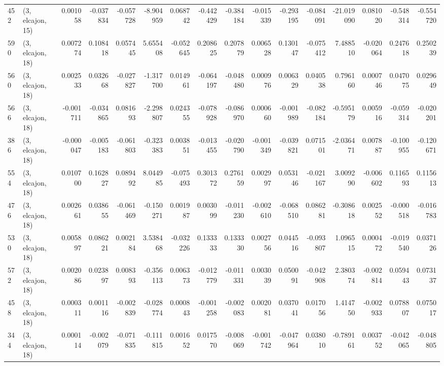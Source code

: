 \begin{tabular}{llrrrrrrrrrrrrrr}
452 &  (3, elcajon, 15) &   0.001058 & -0.037834 & -0.057728 &   -8.904959 &  0.068742 &  -0.442429 &  -0.384184 & -0.015339 & -0.293195 & -0.084091 &  -21.019090 &  0.081020 &  -0.548314 &  -0.554720 \\
590 &  (3, elcajon, 18) &   0.007274 &  0.108418 &  0.057445 &    5.655408 & -0.052645 &   0.208625 &   0.207879 &  0.006528 &  0.130147 & -0.075412 &    7.488510 & -0.020064 &   0.247618 &   0.250239 \\
560 &  (3, elcajon, 18) &   0.002533 &  0.032668 & -0.027827 &   -1.317700 &  0.014961 &  -0.064197 &  -0.048480 &  0.000976 &  0.006329 &  0.040538 &    0.796160 &  0.000746 &   0.047075 &   0.029649 \\
566 &  (3, elcajon, 18) &  -0.001711 & -0.034865 &  0.081693 &   -2.298807 &  0.024355 &  -0.078928 &  -0.086970 &  0.000660 & -0.001989 & -0.082184 &   -0.595179 &  0.005916 &  -0.059314 &  -0.020201 \\
386 &  (3, elcajon, 18) &  -0.000047 & -0.005183 & -0.061803 &   -0.323383 &  0.003851 &  -0.013455 &  -0.020790 & -0.001349 & -0.039821 &  0.071501 &   -2.036471 &  0.007887 &  -0.100955 &  -0.120671 \\
554 &  (3, elcajon, 18) &   0.010700 &  0.162827 &  0.089492 &    8.044985 & -0.075493 &   0.301372 &   0.276159 &  0.002997 &  0.053146 & -0.021167 &    3.009290 & -0.006602 &   0.116593 &   0.115613 \\
476 &  (3, elcajon, 18) &   0.002661 &  0.038655 & -0.061469 &   -0.150271 &  0.001987 &   0.003099 &  -0.011230 & -0.002610 & -0.068510 &  0.086281 &   -0.308618 &  0.002552 &  -0.000518 &  -0.016783 \\
530 &  (3, elcajon, 18) &   0.005897 &  0.086221 &  0.002184 &    3.538468 & -0.032226 &   0.133333 &   0.133330 &  0.002756 &  0.044516 & -0.093807 &    1.096515 &  0.000472 &  -0.019540 &   0.037126 \\
572 &  (3, elcajon, 18) &   0.002086 &  0.023897 &  0.008393 &   -0.356113 &  0.006373 &  -0.012779 &  -0.011331 &  0.003039 &  0.050091 & -0.042908 &    2.380374 & -0.002814 &   0.059443 &   0.073137 \\
458 &  (3, elcajon, 18) &   0.000311 &  0.001116 & -0.002839 &   -0.028774 &  0.000843 &  -0.001258 &  -0.002083 &  0.002081 &  0.037041 &  0.017056 &    1.414750 & -0.002933 &   0.078807 &   0.075017 \\
344 &  (3, elcajon, 18) &   0.000114 & -0.002079 & -0.071835 &   -0.111815 &  0.001652 &   0.017570 &  -0.008069 & -0.001742 & -0.047964 &  0.038010 &   -0.789161 &  0.003752 &  -0.042065 &  -0.048805 \\

\end{tabular}
